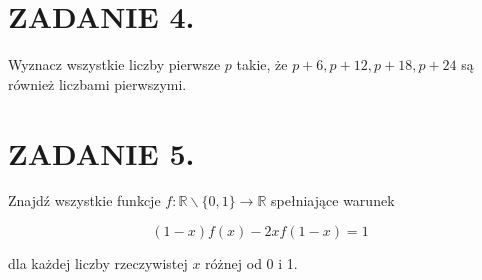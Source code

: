 \documentclass[10pt]{article}
\begin{document}
\section*{ZADANIE 4.}
Wyznacz wszystkie liczby pierwsze \(p\) takie, że \(p+6, p+12, p+18, p+24\) są również liczbami pierwszymi.

\section*{ZADANIE 5.}
Znajdź wszystkie funkcje \(f: \mathbb{R} \backslash\{0,1\} \rightarrow \mathbb{R}\) spełniające warunek

\[
(1-x) f(x)-2 x f(1-x)=1
\]

dla każdej liczby rzeczywistej \(x\) różnej od 0 i 1.
\end{document}
